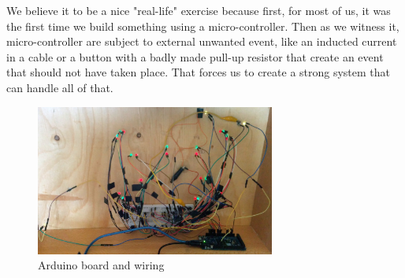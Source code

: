 We believe it to be a nice "real-life" exercise because first, for most of us, it was the first time we build something using a micro-controller. Then as we witness it, micro-controller are subject to external unwanted event, like an inducted current in a cable or a button with a badly made pull-up resistor that create an event that should not have taken place. That forces us to create a strong system that can handle all of that.


\begin{figure}[H]\label{fig:ardhazard}
  \centering
    \includegraphics[width=0.7\textwidth]{../common/images/arduinowiring.jpg}
    \caption{Arduino board and wiring}
\end{figure}